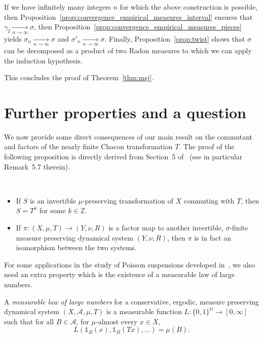 \documentclass[AHL,Unicode,longabstracts]{cedram}
\newcommand{\tend}[3][]{\xrightarrow[#2\to#3]{#1}}
\newcommand{\ind}[1]{\mathds{1}_{#1}}
\newcommand{\ZZ}{\mathbb{Z}}
\newcommand{\NN}{\mathbb{N}}
\newcommand{\A}{\mathscr{A}}
\begin{document}
If we have infinitely many integers $n$ for which the above construction is possible, then Proposition~\ref{prop:convergence_empirical_measures_interval} ensures that $\gamma_I\tend{n}{\infty}\sigma$, then Proposition~\ref{prop:convergence_empirical_measures_pieces} yields $\sigma_n\tend{n}{\infty}\sigma$ and $\sigma'_n\tend{n}{\infty}\sigma$. Finally, Proposition~\ref{prop:twist} shows that $\sigma$ can be decomposed as a product of two Radon measures to which we can apply the induction hypothesis.


This concludes the proof of Theorem~\ref{thm:msj}.


\section{Further properties and a question}
\label{sec:further_properties}

We now provide some direct consequences of our main result on the commutant and factors of the nearly finite Chacon transformation $T$. The proof of the following proposition is directly derived from Section~5 of~\cite{ChaconInfinite} (see in particular Remark~5.7 therein).

\begin{prop}\ 
\begin{itemize}
\item If $S$ is an invertible $\mu$-preserving transformation of $X$ commuting with $T$, then $S=T^k$ for some $k\in\ZZ$.
\item If $\pi:(X,\mu,T)\to (Y,\nu,R)$ is a factor map to another invertible, $\sigma$-finite measure preserving dynamical system $(Y,\nu,R)$, then $\pi$ is in fact an isomorphism between the two systems.
\end{itemize}
\end{prop}

For some applications in the study of Poisson suspensions developed in~\cite{sushis}, we also need an extra property which is the existence of a measurable law of large numbers.


\begin{defi}
A \emph{measurable law of large numbers} for a conservative, ergodic, measure preserving dynamical system $(X,\A,\mu,T)$ is a measurable function $L:\{0,1\}^\NN\to[0,\infty]$ such that for all $B\in\A$, for $\mu$-almost every $x\in X$,
\[
L\left(\ind{B}(x),\ind{B}(Tx),\ldots\right) = \mu(B).
\]
\end{defi}
\end{document}
